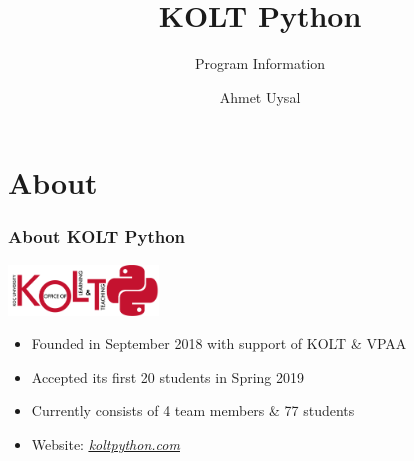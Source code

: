 

\usepackage{../KU-Beamer-Template/style/koc} 

\title{KOLT Python} 
\subtitle{Program Information} 
\date{}
\author{Ahmet Uysal}




  \maketitle


  \section{About}

    \begin{frame}
      \frametitle{About KOLT Python}
      \pause
      \begin{center}
        \includegraphics[width=0.3\textwidth]{images/kolt_python_logo.png}
      \end{center}
      \Large
      \begin{itemize}
        \item Founded in September 2018 with support of KOLT \& VPAA
        \pause
        \item Accepted its first 20 students in Spring 2019
        \pause
        \item Currently consists of 4 team members \& 77 students
        \pause
        \item Website: \href{https://koltpython.com}{\underline{\textit{koltpython.com}}}
      \end{itemize}

    \end{frame}


